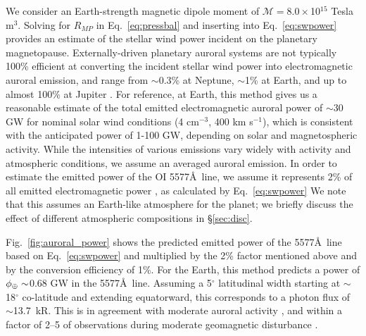 \documentclass{emulateapj}
\newcommand{\XXX}[1]{#1}      %
\begin{document}
We consider an Earth-strength magnetic dipole moment of $\mathcal{M}=8.0\times$10$^{15}$ Tesla m$^3$. Solving for $R_{MP}$ in Eq.~\ref{eq:pressbal} and inserting into Eq.~\ref{eq:swpower} provides an estimate of the stellar wind power incident on the planetary magnetopause. Externally-driven planetary auroral systems are not typically 100\% efficient at converting the incident stellar wind power into electromagnetic auroral emission, and range from $\sim$0.3\% at Neptune, $\sim$1\% at Earth, and up to almost 100\% at Jupiter \citep[e.g.][]{Cheng1990,Bhardwaj2000}. For reference, at Earth, this method gives us a reasonable estimate of the total emitted electromagnetic auroral power of $\sim$30 GW for nominal solar wind conditions (4 cm$^{-3}$, 400 km s$^{-1}$), which is consistent with the anticipated power of 1-100 GW, depending on solar and magnetospheric activity. While the intensities of various emissions vary widely with activity and atmospheric conditions, we assume an averaged auroral emission. In order to estimate the emitted power of the OI 5577\AA\ line, we assume it represents 2\% of all emitted electromagnetic power \citep{Chamberlain1961,Kivelson1995}, as calculated by Eq.~\ref{eq:swpower} \XXX{We note that this assumes an Earth-like atmosphere for the planet; we briefly discuss the effect of different atmospheric compositions in \S\ref{sec:disc}}.

Fig.~\ref{fig:auroral_power} shows the predicted emitted power of the 5577\AA\ line based on Eq.~\ref{eq:swpower} and multiplied by the 2\% factor mentioned above and by the conversion efficiency of 1\%. For the Earth, this method predicts a power of \XXX{$\phi_{\oplus}\sim$}0.68 GW in the 5577\AA\ line. Assuming a 5$^{\circ}$ latitudinal width starting at $\sim$18$^{\circ}$ co-latitude and extending equatorward, this corresponds to a photon flux of $\sim$13.7~kR. This is in agreement \XXX{with moderate auroral activity \citep[IBC II, 10 kR 5577\AA\ emission; see][]{Chamberlain1961}, and within a factor of 2--5 of observations during moderate geomagnetic disturbance \citep[2.5--6 kR 5577 \AA\ emission, e.g.][]{Steele1990}.}

\end{document}
